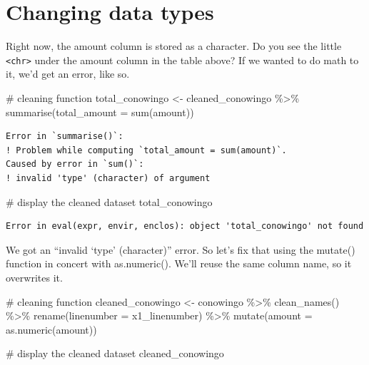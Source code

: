 \documentclass[
  letterpaper,
  DIV=11,
  numbers=noendperiod]{scrreprt}
\newenvironment{Shaded}{\begin{snugshade}}{\end{snugshade}}
\newcommand{\AttributeTok}[1]{\textcolor[rgb]{0.40,0.45,0.13}{#1}}
\newcommand{\CommentTok}[1]{\textcolor[rgb]{0.37,0.37,0.37}{#1}}
\newcommand{\FunctionTok}[1]{\textcolor[rgb]{0.28,0.35,0.67}{#1}}
\newcommand{\NormalTok}[1]{\textcolor[rgb]{0.00,0.23,0.31}{#1}}
\newcommand{\OtherTok}[1]{\textcolor[rgb]{0.00,0.23,0.31}{#1}}
\newcommand{\SpecialCharTok}[1]{\textcolor[rgb]{0.37,0.37,0.37}{#1}}
\begin{document}
\hypertarget{changing-data-types}{%
\section{Changing data types}\label{changing-data-types}}

Right now, the amount column is stored as a character. Do you see the
little \texttt{\textless{}chr\textgreater{}} under the amount column in
the table above? If we wanted to do math to it, we'd get an error, like
so.

\begin{Shaded}
\begin{Highlighting}[]
\CommentTok{\# cleaning function}
\NormalTok{total\_conowingo }\OtherTok{\textless{}{-}}\NormalTok{ cleaned\_conowingo }\SpecialCharTok{\%\textgreater{}\%}
  \FunctionTok{summarise}\NormalTok{(}\AttributeTok{total\_amount =} \FunctionTok{sum}\NormalTok{(amount))}
\end{Highlighting}
\end{Shaded}

\begin{verbatim}
Error in `summarise()`:
! Problem while computing `total_amount = sum(amount)`.
Caused by error in `sum()`:
! invalid 'type' (character) of argument
\end{verbatim}

\begin{Shaded}
\begin{Highlighting}[]
\CommentTok{\# display the cleaned dataset}
\NormalTok{total\_conowingo}
\end{Highlighting}
\end{Shaded}

\begin{verbatim}
Error in eval(expr, envir, enclos): object 'total_conowingo' not found
\end{verbatim}

We got an ``invalid `type' (character)'' error. So let's fix that using
the mutate() function in concert with as.numeric(). We'll reuse the same
column name, so it overwrites it.

\begin{Shaded}
\begin{Highlighting}[]
\CommentTok{\# cleaning function}
\NormalTok{cleaned\_conowingo }\OtherTok{\textless{}{-}}\NormalTok{ conowingo }\SpecialCharTok{\%\textgreater{}\%}
  \FunctionTok{clean\_names}\NormalTok{() }\SpecialCharTok{\%\textgreater{}\%}
  \FunctionTok{rename}\NormalTok{(}\AttributeTok{linenumber =}\NormalTok{ x1\_linenumber) }\SpecialCharTok{\%\textgreater{}\%}
  \FunctionTok{mutate}\NormalTok{(}\AttributeTok{amount =} \FunctionTok{as.numeric}\NormalTok{(amount))}


\CommentTok{\# display the cleaned dataset}
\NormalTok{cleaned\_conowingo}
\end{Highlighting}
\end{Shaded}
\end{document}
